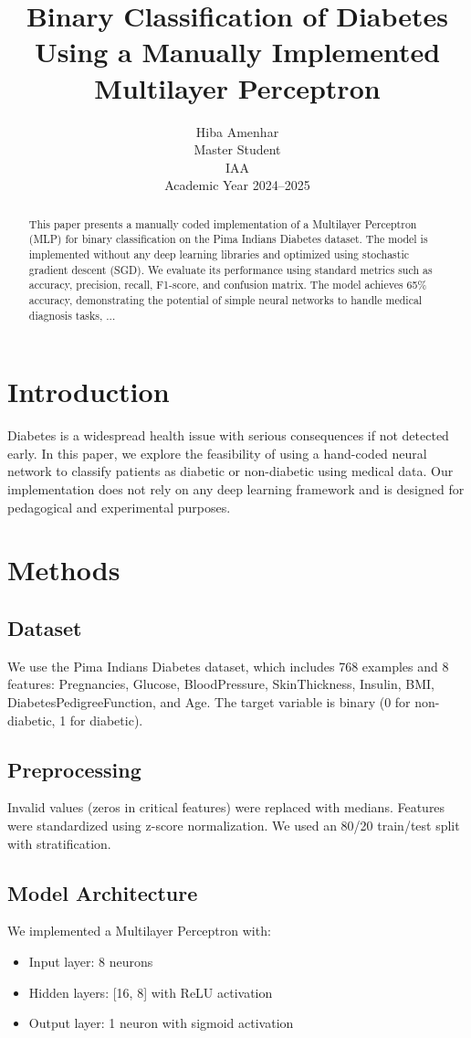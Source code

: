 \documentclass[12pt]{article}
\title{Binary Classification of Diabetes Using a Manually Implemented Multilayer Perceptron}
\author{Hiba Amenhar\\Master Student \\ IAA \\ Academic Year 2024--2025}
\date{}
\begin{document}
\maketitle

\begin{abstract}
This paper presents a manually coded implementation of a Multilayer Perceptron (MLP) for binary classification on the Pima Indians Diabetes dataset. The model is implemented without any deep learning libraries and optimized using stochastic gradient descent (SGD). We evaluate its performance using standard metrics such as accuracy, precision, recall, F1-score, and confusion matrix. The model achieves 65\% accuracy, demonstrating the potential of simple neural networks to handle medical diagnosis tasks, ...
\end{abstract}

\section{Introduction}
Diabetes is a widespread health issue with serious consequences if not detected early. In this paper, we explore the feasibility of using a hand-coded neural network to classify patients as diabetic or non-diabetic using medical data. Our implementation does not rely on any deep learning framework and is designed for pedagogical and experimental purposes.

\section{Methods}
\subsection{Dataset}
We use the Pima Indians Diabetes dataset, which includes 768 examples and 8 features: Pregnancies, Glucose, BloodPressure, SkinThickness, Insulin, BMI, DiabetesPedigreeFunction, and Age. The target variable is binary (0 for non-diabetic, 1 for diabetic).

\subsection{Preprocessing}
Invalid values (zeros in critical features) were replaced with medians. Features were standardized using z-score normalization. We used an 80/20 train/test split with stratification.

\subsection{Model Architecture}
We implemented a Multilayer Perceptron with:
\begin{itemize}
    \item Input layer: 8 neurons
    \item Hidden layers: [16, 8] with ReLU activation
    \item Output layer: 1 neuron with sigmoid activation
\end{itemize}
\end{document}

